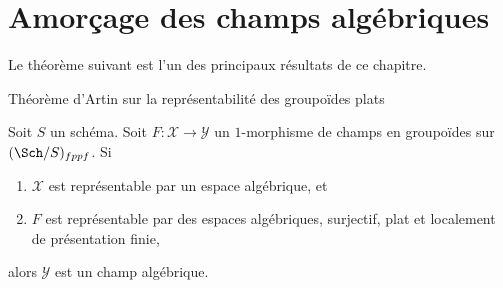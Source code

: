 \section{Amorçage des champs algébriques}
\label{section-bootstrap}

\noindent
Le théorème suivant est l'un des principaux résultats de ce chapitre.

\begin{theorem}
\label{theorem-bootstrap}
\begin{slogan}
Théorème d'Artin sur la représentabilité des groupoïdes plats
\end{slogan}
Soit $S$ un schéma. Soit $F : \mathcal{X} \to \mathcal{Y}$
un $1$-morphisme de champs en groupoïdes sur $(\Sch/S)_{fppf}$. Si
\begin{enumerate}
\item $\mathcal{X}$ est représentable par un espace algébrique, et
\item $F$ est représentable par des espaces algébriques, surjectif, plat et
localement de présentation finie,
\end{enumerate}
alors $\mathcal{Y}$ est un champ algébrique.
\end{theorem}

